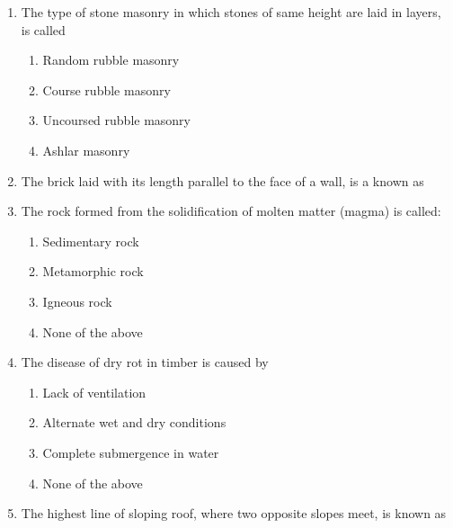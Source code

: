 \documentclass[11pt,a4paper]{article}
\begin{document}
\begin{enumerate}
\begin{enumerate*}[itemjoin=\qquad, label=\Alph*.]
\end{enumerate*}
\item{The type of stone masonry in which stones of same height are laid in layers, is called}
\begin{enumerate}[label=\Alph*.]
\item{Random rubble masonry}
\item{Course rubble masonry}
\item{Uncoursed rubble masonry}
\item{Ashlar masonry}
\end{enumerate}
\item{The brick laid with its length parallel to the face of a wall, is a known as}
\\
\item{The rock formed from the solidification of molten matter (magma) is called:}
\begin{enumerate}[label=\Alph*.]
\item{Sedimentary rock}
\item{Metamorphic rock}
\item{Igneous rock}
\item{None of the above}
\end{enumerate}
\item{The disease of dry rot in timber is caused by}
\begin{enumerate}[label=\Alph*.]
\item{Lack of ventilation}
\item{Alternate wet and dry conditions}
\item{Complete submergence in water}
\item{None of the above}
\end{enumerate}
\item{The highest line of sloping roof, where two opposite slopes meet, is known as}
\\
\end{enumerate}
\end{document}
